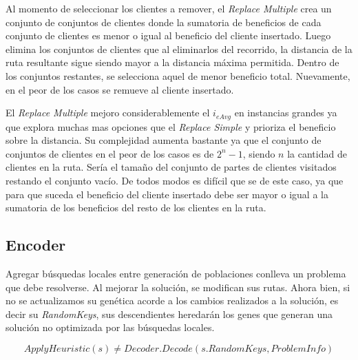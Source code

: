 \bigskip

Al momento de seleccionar los clientes a remover, el \textit{Replace Multiple} crea un conjunto de conjuntos de clientes donde la sumatoria de beneficios de cada conjunto de clientes es menor o igual al beneficio del cliente insertado. Luego elimina los conjuntos de clientes que al eliminarlos del recorrido, la distancia de la ruta resultante sigue siendo mayor a la distancia máxima permitida. Dentro de los conjuntos restantes, se selecciona aquel de menor beneficio total. Nuevamente, en el peor de los casos se remueve al cliente insertado.

\bigskip

El \textit{Replace Multiple} mejoro considerablemente el $i_{eAvg}$ en instancias grandes ya que explora muchas mas opciones que el \textit{Replace Simple} y prioriza el beneficio sobre la distancia. Su complejidad aumenta bastante ya que el conjunto de conjuntos de clientes en el peor de los casos es de $2^n-1$, siendo $n$ la cantidad de clientes en la ruta. Sería el tamaño del conjunto de partes de clientes visitados restando el conjunto vacío. De todos modos es difícil que se de este caso, ya que para que suceda el beneficio del cliente insertado debe ser mayor o igual a la sumatoria de los beneficios del resto de los clientes en la ruta.

\subsection{Encoder}

Agregar búsquedas locales entre generación de poblaciones conlleva un problema que debe resolverse. Al mejorar la solución, se modifican sus rutas. Ahora bien, si no se actualizamos su genética acorde a los cambios realizados a la solución, es decir su \textit{RandomKeys}, sus descendientes heredarán los genes que generan una solución no optimizada por las búsquedas locales.

\begin{equation*}
ApplyHeuristic(s) \neq Decoder.Decode(s.RandomKeys, ProblemInfo)
\end{equation*}

